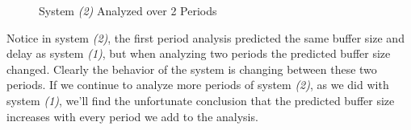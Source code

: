 \begin{figure}[ht!]
  \centering
  \caption{System \emph{(2)} Analyzed over 2 Periods}
  \label{fig:2_period_system_2}
\end{figure}

Notice in system \emph{(2)}, the first period analysis predicted the same
buffer size and delay as system \emph{(1)}, but when analyzing two periods
the predicted buffer size changed.  Clearly the behavior of the system
is changing between these two periods.  If we continue to analyze more
periods of system \emph{(2)}, as we did with system \emph{(1)}, we'll find the
unfortunate conclusion that the predicted buffer size increases with
every period we add to the analysis.

